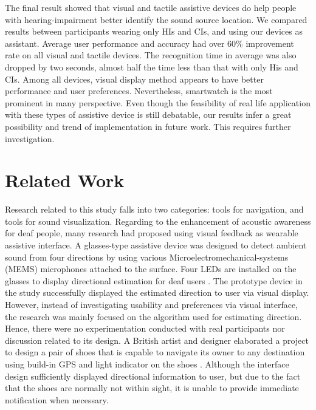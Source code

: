 \documentclass{sigchi}
\begin{document}
The final result showed that visual and tactile assistive devices do help people with hearing-impairment better identify the sound source location. We compared results between participants wearing only HIs and CIs, and using our devices as assistant. Average user performance and accuracy had over 60\% improvement rate on all visual and tactile devices. The recognition time in average was also dropped by two seconds, almost half the time less than that with only His and CIs. Among all devices, visual display method appears to have better performance and user preferences. Nevertheless, smartwatch is the most prominent in many perspective. Even though the feasibility of real life application with these types of assistive device is still debatable, our results infer a great possibility and trend of implementation in future work. This requires further investigation.

\section{Related Work}
Research related to this study falls into two categories: tools for navigation, and tools for sound visualization. Regarding to the enhancement of acoustic awareness for deaf people, many research had proposed using visual feedback as wearable assistive interface. A glasses-type assistive device was designed to detect ambient sound from four directions by using various Microelectromechanical-systems (MEMS) microphones attached to the surface. Four LEDs are installed on the glasses to display directional estimation for deaf users \cite{Kim2013}. The prototype device in the study successfully displayed the estimated direction to user via visual display. However, instead of investigating usability and preferences via visual interface, the research was mainly focused on the algorithm used for estimating direction. Hence, there were no experimentation conducted with real participants nor discussion related to its design. A British artist and designer elaborated a project to design a pair of shoes that is capable to navigate its owner to any destination using build-in GPS and light indicator on the shoes \cite{Wilcox2012}. Although the interface design sufficiently displayed directional information to user, but due to the fact that the shoes are normally not within sight, it is unable to provide immediate notification when necessary.
\end{document}
